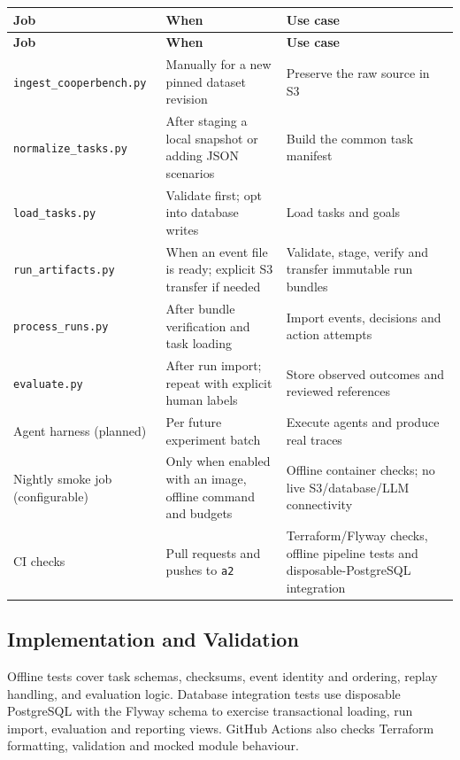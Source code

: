 \documentclass[11pt]{article}
\newcommand{\code}[1]{\texttt{#1}}
\begin{document}
{\small
\begin{longtable}{@{}L{3.8cm}L{\dimexpr\linewidth-7.8cm-4\tabcolsep\relax}L{4.0cm}@{}}
\toprule
\textbf{Job} & \textbf{When} & \textbf{Use case} \\
\midrule
\endfirsthead
\toprule
\textbf{Job} & \textbf{When} & \textbf{Use case} \\
\midrule
\endhead
\bottomrule
\endlastfoot
\nolinkurl{ingest_cooperbench.py} & Manually for a new pinned dataset revision & Preserve the raw source in S3 \\
\nolinkurl{normalize_tasks.py} & After staging a local snapshot or adding JSON scenarios & Build the common task manifest \\
\nolinkurl{load_tasks.py} & Validate first; opt into database writes & Load tasks and goals \\
\nolinkurl{run_artifacts.py} & When an event file is ready; explicit S3 transfer if needed & Validate, stage, verify and transfer immutable run bundles \\
\nolinkurl{process_runs.py} & After bundle verification and task loading & Import events, decisions and action attempts \\
\code{evaluate.py} & After run import; repeat with explicit human labels & Store observed outcomes and reviewed references \\
Agent harness (planned) & Per future experiment batch & Execute agents and produce real traces \\
Nightly smoke job (configurable) & Only when enabled with an image, offline command and budgets & Offline container checks; no live S3/database/LLM connectivity \\
CI checks & Pull requests and pushes to \code{a2} & Terraform/Flyway checks, offline pipeline tests and disposable-PostgreSQL integration \\
\end{longtable}
}

\subsection*{Implementation and Validation}

  Offline tests cover task schemas, checksums, event identity and ordering,
  replay handling, and evaluation logic. Database integration tests use
  disposable PostgreSQL with the Flyway schema to exercise transactional
  loading, run import, evaluation and reporting views. GitHub Actions
  also checks Terraform formatting, validation and mocked module behaviour.
\end{document}
